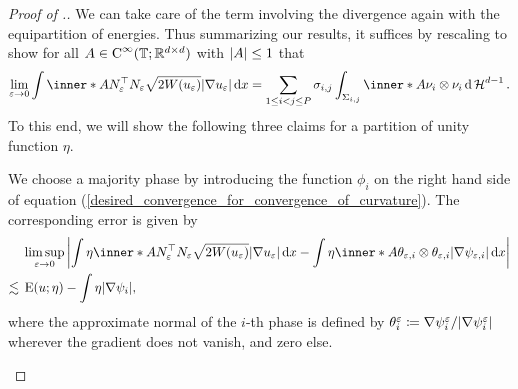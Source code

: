 \begin{proof}[Proof of .]
	We can take care of the term involving the divergence again with the 
	equipartition of energies. 
	Thus summarizing our results, it suffices by rescaling to show for all $ 
	A \in \operatorname{C}^{ \infty } ( \operatorname{\mathbb{T}} ; \mathbb{ R }^{ d \times d } ) $ with 
	$ \abs{ A } \leq 1 $ that
	\begin{equation}
		\label{desired_convergence_for_convergence_of_curvature}
		\lim_{ \varepsilon \to 0 }
		\int
		\inner*{ A }{ N_{ \varepsilon }^{ \top } N_{ \varepsilon } }
		\sqrt{ 2 W ( u_{ \varepsilon } ) }
		\abs{ \nabla u_{ \varepsilon } }
		\dd{ x }
		=
		\sum_{ 1 \leq i < j \leq P }
		\sigma_{ i , j }
		\int_{ \Sigma_{ i , j } }
		\inner*{ A }{ \nu_{ i } \otimes \nu_{ i } }
		\dd{ \hm^{ d - 1 } }.
	\end{equation}
	To this end, we will show the following three claims for a partition of 
	unity function $ \eta $.
	\begin{description}[wide=0pt]
		\item[Claim 1:]
		We choose a majority phase by introducing the function $ \phi_{ i } $ 
		on the right hand side of equation 
		(\ref{desired_convergence_for_convergence_of_curvature}). The 
		corresponding error is given by
		\begin{align*}
			& \limsup_{ \varepsilon \to 0 }
			\abs{ 
				\int
				\eta 
				\inner*{ A }{ N_{ \varepsilon }^{ \top } N_{ \varepsilon } }
				\sqrt{ 2 W ( u_{ \varepsilon } ) } \abs{ \nabla u_{ \varepsilon 
				} } 
				\dd{ x }
				-
				\int
				\eta
				\inner*{ A }{ \theta_{ \varepsilon, i } \otimes \theta_{ 
						\varepsilon , i } }
				\abs{ \nabla \psi_{ \varepsilon , i } }
				\dd{ x }
			}
			\\
			\lesssim{} &
			\energy ( u ; \eta ) 
			-
			\int
			\eta
			\abs{ \nabla \psi_{ i } },
		\end{align*}
		where the approximate normal of the $ i$-th phase is defined by $ 
		\theta_{ 
		i }^{ \varepsilon } \coloneqq \nabla \psi_{ i }^{ \varepsilon } / \abs{ 
		\nabla \psi_{ i }^{ \varepsilon } } $ wherever the gradient does not 
		vanish, and zero else.
		

\end{description}
\end{proof}
